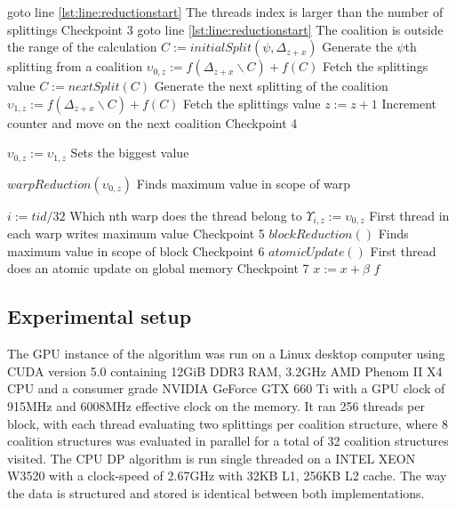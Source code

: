 \documentclass{llncs}
\begin{document}
\begin{algorithm}
\begin{algorithmic}[1]
  \IF{$\psi \geq \Psi$}
    \STATE goto line \ref{lst:line:reductionstart} \hfill The threads index is larger than the number of splittings
  \ENDIF
\hfill Checkpoint 3
    \label{lst:line:gotoif}
      \STATE goto line \ref{lst:line:reductionstart} \hfill The coalition is outside the range of the calculation
    \ENDIF
    \STATE $C := initialSplit(\psi,\Delta_{z+x})$ \hfill Generate the $\psi$th splitting from a coalition 
    \STATE $\upsilon_{0,z} := f(\Delta_{z+x}\backslash C)+f(C)$ \hfill Fetch the splittings value
    \STATE $C := nextSplit(C)$ \hfill Generate the next splitting of the coalition
    \STATE $\upsilon_{1,z} := f(\Delta_{z+x}\backslash C)+f(C)$ \hfill Fetch the splittings value
    \STATE $z := z + 1$ \hfill Increment counter and move on the next coalition
  \ENDFOR
\hfill Checkpoint 4
  \label{lst:line:reductionstart}
  
    \label{lst:line:checkif}
      \STATE $\upsilon_{0,z} := \upsilon_{1,z}$ \hfill Sets the biggest value
    \ENDIF
    
    \STATE $warpReduction(\upsilon_{0,z})$ \hfill Finds maximum value in scope of warp

      \STATE $i := tid / 32$ \hfill Which nth warp does the thread belong to
      \STATE $\Upsilon_{i,z} := \upsilon_{0,z}$ \hfill First thread in each warp writes maximum value
    \ENDIF
  \ENDFOR   \hfill Checkpoint 5
  \STATE $blockReduction()$\label{lst:line:blockReduction} \hfill Finds maximum value in scope of block
  \hfill Checkpoint 6
  \STATE $atomicUpdate()$\label{lst:line:reductionend} \hfill First thread does an atomic update on global memory
  \ENDIF  \hfill Checkpoint 7
  \STATE $x := x + \beta$
\ENDFOR
\RETURN $f$
\end{algorithmic}
\end{algorithm}

\subsection{Experimental setup}

The GPU instance of the algorithm was run on a Linux desktop computer using CUDA version 5.0 containing 12GiB DDR3 RAM, 
3.2GHz AMD Phenom II X4 CPU and a consumer grade NVIDIA GeForce GTX 660 Ti with a GPU clock of 915MHz and 6008MHz effective clock on the memory.
It ran 256 threads per block, with each thread evaluating two splittings per coalition structure, 
where 8 coalition structures was evaluated in parallel for a total of 32 coalition structures visited.
The CPU DP algorithm is run single threaded on a INTEL XEON W3520 with a clock-speed of 2.67GHz with 32KB L1, 256KB L2 cache. 
The way the data is structured and stored is identical between both implementations.
\end{document}
